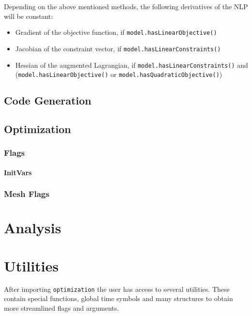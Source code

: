 \documentclass[12pt]{article}
\begin{document}
	Depending on the above mentioned methods, the following derivatives of the NLP will be constant:
	
	\begin{itemize}
		\item Gradient of the objective function, if \texttt{model.hasLinearObjective()}
		\item Jacobian of the constraint vector, if \texttt{model.hasLinearConstraints()}
		\item Hessian of the augmented Lagrangian, if \texttt{model.hasLinearConstraints()} and (\texttt{model.hasLinearObjective()} or \texttt{model.hasQuadraticObjective()})
	\end{itemize}
	
	
	\subsection{Code Generation}
	
	\subsection{Optimization}
	
	\subsubsection{Flags}
	
	\paragraph{InitVars}
	\label{p:initVars}
	
	\subsubsection{Mesh Flags}
	
	\section{Analysis}
	
	
	\section{Utilities}
	After importing \texttt{optimization} the user has access to several utilities. These contain special functions, global time symbols and many structures to obtain more streamlined flags and arguments.
	
\end{document}
